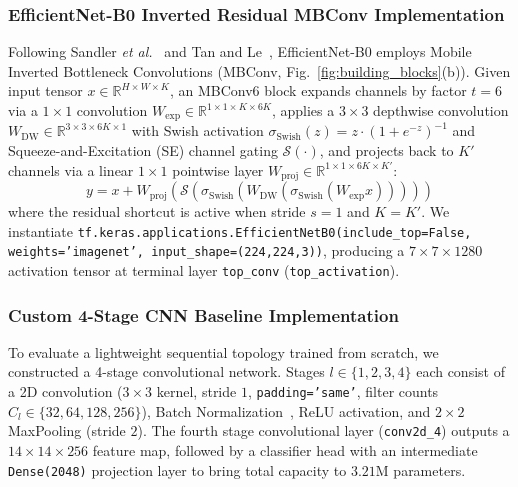 \documentclass[journal]{IEEEtran}
\begin{document}
\subsubsection{EfficientNet-B0 Inverted Residual MBConv Implementation}
Following Sandler \textit{et al.}~\cite{sandler2018} and Tan and Le~\cite{tan2019}, EfficientNet-B0 employs Mobile Inverted Bottleneck Convolutions (MBConv, Fig.~\ref{fig:building_blocks}(b)). Given input tensor $x \in \mathbb{R}^{H \times W \times K}$, an MBConv6 block expands channels by factor $t=6$ via a $1\times 1$ convolution $W_{\text{exp}} \in \mathbb{R}^{1 \times 1 \times K \times 6K}$, applies a $3\times 3$ depthwise convolution $W_{\text{DW}} \in \mathbb{R}^{3 \times 3 \times 6K \times 1}$ with Swish activation $\sigma_{\text{Swish}}(z) = z \cdot (1 + e^{-z})^{-1}$ and Squeeze-and-Excitation (SE) channel gating $\mathcal{S}(\cdot)$, and projects back to $K'$ channels via a linear $1\times 1$ pointwise layer $W_{\text{proj}} \in \mathbb{R}^{1 \times 1 \times 6K \times K'}$:
\begin{equation}
y = x + W_{\text{proj}}\left( \mathcal{S}\left( \sigma_{\text{Swish}}\left( W_{\text{DW}}\left( \sigma_{\text{Swish}}\left( W_{\text{exp}} x \right) \right) \right) \right) \right)
\end{equation}
where the residual shortcut is active when stride $s=1$ and $K = K'$. We instantiate \texttt{tf.keras.applications.EfficientNetB0(include\_top=False, weights='imagenet', input\_shape=(224,224,3))}, producing a $7 \times 7 \times 1280$ activation tensor at terminal layer \texttt{top\_conv} (\texttt{top\_activation}).

\subsubsection{Custom 4-Stage CNN Baseline Implementation}
To evaluate a lightweight sequential topology trained from scratch, we constructed a 4-stage convolutional network. Stages $l \in \{1,2,3,4\}$ each consist of a 2D convolution ($3\times 3$ kernel, stride $1$, \texttt{padding='same'}, filter counts $C_l \in \{32, 64, 128, 256\}$), Batch Normalization~\cite{ioffe2015}, ReLU activation, and $2\times 2$ MaxPooling (stride $2$). The fourth stage convolutional layer (\texttt{conv2d\_4}) outputs a $14 \times 14 \times 256$ feature map, followed by a classifier head with an intermediate \texttt{Dense(2048)} projection layer to bring total capacity to $3.21\text{M}$ parameters.
\end{document}
